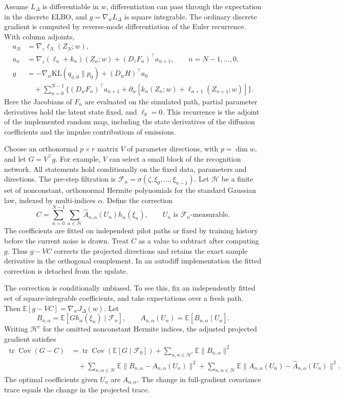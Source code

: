 \documentclass[12pt]{article}
\newcommand{\E}{\mathbb{E}}
\newcommand{\KL}{\mathrm{KL}}
\newcommand{\tr}{\operatorname{tr}}
\newcommand{\Cov}{\operatorname{Cov}}
\newcommand{\F}{\mathcal{F}}
\begin{document}
Assume \(L_\Delta\) is differentiable in \(w\), differentiation can pass through the expectation in the discrete ELBO, and \(g=\nabla_w L_\Delta\) is square integrable. The ordinary discrete gradient is computed by reverse-mode differentiation of the Euler recurrence. With column adjoints,
\begin{align*}
 a_N &= \nabla_z\ell_N(Z_N;w), \\
 a_n &= \nabla_z(\ell_n+k_n)(Z_n;w)+(D_zF_n)^\top a_{n+1},
 \qquad  n=N-1,\ldots,0,\\
 g &= -\nabla_w\KL(q_{\phi,0}\|p_0)+(D_wH)^\top a_0 \\
 &\quad+\sum_{n=0}^{N-1}\bigl\{(D_wF_n)^\top a_{n+1}
   +\partial_w[k_n(Z_n;w)+\ell_{n+1}(Z_{n+1};w)]\bigr\}.
\end{align*}
Here the Jacobians of \(F_n\) are evaluated on the simulated path, partial parameter derivatives hold the latent state fixed, and \(\ell_0=0\). This recurrence is the adjoint of the implemented random map, including the state derivatives of the diffusion coefficients and the impulse contributions of emissions.

Choose an orthonormal \(p\times r\) matrix \(V\) of parameter directions, with \(p=\dim w\), and let \(G=V^\top g\). For example, \(V\) can select a small block of the recognition network. All statements hold conditionally on the fixed data, parameters and directions. The pre-step filtration is \(\F_n=\sigma(\zeta,\xi_0,\ldots,\xi_{n-1})\). Let \(\mathcal H\) be a finite set of nonconstant, orthonormal Hermite polynomials for the standard Gaussian law, indexed by multi-indices \(\alpha\). Define the correction
\[
 C=\sum_{n=0}^{N-1}\sum_{\alpha\in\mathcal H}
      \widehat A_{n,\alpha}(U_n)h_\alpha(\xi_n),
 \qquad U_n\text{ is }\F_n\text{-measurable}.
\]
The coefficients are fitted on independent pilot paths or fixed by training history before the current noise is drawn. Treat \(C\) as a value to subtract after computing \(g\). Thus \(g-VC\) corrects the projected directions and retains the exact sample derivative in the orthogonal complement. In an autodiff implementation the fitted correction is detached from the update.

The correction is conditionally unbiased. To see this, fix an independently fitted set of square-integrable coefficients, and take expectations over a fresh path. Then
\(\E[g-VC]=\nabla_w J_\Delta(w)\).
Let
\[
 B_{n,\alpha}=\E[G h_\alpha(\xi_n)\mid\F_n],
 \qquad A_{n,\alpha}(U_n)=\E[B_{n,\alpha}\mid U_n].
\]
Writing \(\mathcal H^c\) for the omitted nonconstant Hermite indices, the adjusted projected gradient satisfies
\begin{align*}
\tr\Cov(G-C) &=
 \tr\Cov(\E[G\mid\F_0])+
 \sum_{n,\alpha\in\mathcal H^c}\E\|B_{n,\alpha}\|^2
 \\
 &\quad+\sum_{n,\alpha\in\mathcal H}\E\|B_{n,\alpha}-A_{n,\alpha}(U_n)\|^2
       +\sum_{n,\alpha\in\mathcal H}\E\|A_{n,\alpha}(U_n)-\widehat A_{n,\alpha}(U_n)\|^2.
\end{align*}
The optimal coefficients given \(U_n\) are \(A_{n,\alpha}\). The change in full-gradient covariance trace equals the change in the projected trace.
\end{document}
